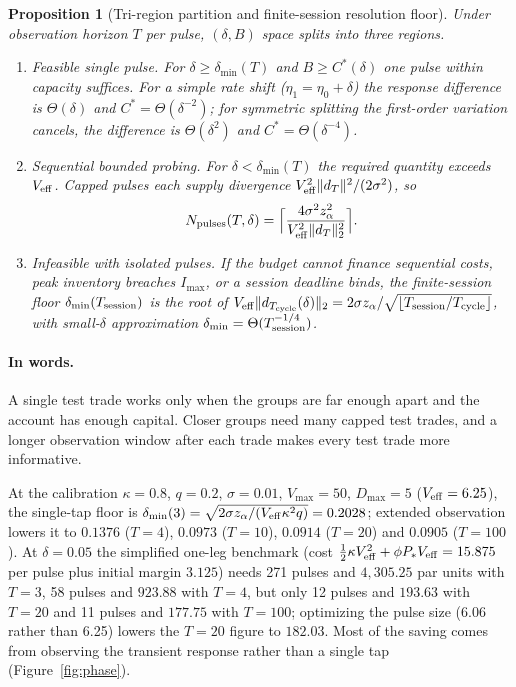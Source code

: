 \documentclass[12pt]{article}
\newtheorem{proposition}[theorem]{Proposition}
\theoremstyle{definition}
\theoremstyle{remark}
\begin{document}
\begin{proposition}[Tri-region partition and finite-session resolution floor]\label{prop:tri}
Under observation horizon $T$ per pulse, $(\delta,B)$ space splits into three regions.
\begin{enumerate}[label=(\roman*)]
\item \emph{Feasible single pulse.} For $\delta\ge\delta_{\min}(T)$ and $B\ge C^*(\delta)$ one pulse within capacity suffices. For a simple rate shift ($\eta_1=\eta_0+\delta$) the response difference is $\Theta(\delta)$ and $C^*=\Theta(\delta^{-2})$; for symmetric splitting the first-order variation cancels, the difference is $\Theta(\delta^2)$ and $C^*=\Theta(\delta^{-4})$.
\item \emph{Sequential bounded probing.} For $\delta<\delta_{\min}(T)$ the required quantity exceeds $V_{\rm eff}$. Capped pulses each supply divergence $V_{\rm eff}^2\|d_T\|^2/(2\sigma^2)$, so
\begin{equation}\label{eq:npulses}
N_{\rm pulses}(T,\delta)=\Bigl\lceil\frac{4\sigma^2z_\alpha^2}{V_{\rm eff}^2\|d_T\|_2^2}\Bigr\rceil .
\end{equation}
\item \emph{Infeasible with isolated pulses.} If the budget cannot finance sequential costs, peak inventory breaches $I_{\max}$, or a session deadline binds, the finite-session floor $\delta_{\min}(T_{\rm session})$ is the root of $V_{\rm eff}\|d_{T_{\rm cycle}}(\delta)\|_2=2\sigma z_\alpha/\sqrt{\lfloor T_{\rm session}/T_{\rm cycle}\rfloor}$, with small-$\delta$ approximation $\delta_{\min}=\Theta(T_{\rm session}^{-1/4})$.
\end{enumerate}
\end{proposition}

\paragraph{In words.} A single test trade works only when the groups are far enough apart and the account has enough capital. Closer groups need many capped test trades, and a longer observation window after each trade makes every test trade more informative.

At the calibration $\kappa=0.8$, $q=0.2$, $\sigma=0.01$, $V_{\max}=50$, $D_{\max}=5$ ($V_{\rm eff}=6.25$), the single-tap floor is $\delta_{\min}(3)=\sqrt{2\sigma z_\alpha/(V_{\rm eff}\kappa^2q)}=0.2028$; extended observation lowers it to $0.1376$ ($T=4$), $0.0973$ ($T=10$), $0.0914$ ($T=20$) and $0.0905$ ($T=100$). At $\delta=0.05$ the simplified one-leg benchmark (cost $\tfrac12\kappa V_{\rm eff}^2+\phi P_*V_{\rm eff}=15.875$ per pulse plus initial margin $3.125$) needs 271 pulses and $4{,}305.25$ par units with $T=3$, 58 pulses and $923.88$ with $T=4$, but only 12 pulses and $193.63$ with $T=20$ and 11 pulses and $177.75$ with $T=100$; optimizing the pulse size (6.06 rather than 6.25) lowers the $T=20$ figure to $182.03$. Most of the saving comes from observing the transient response rather than a single tap (Figure~\ref{fig:phase}).
\end{document}
